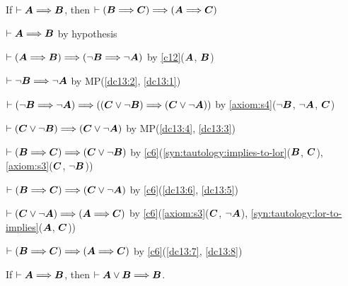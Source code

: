 \begin{dc}\label{c13}%
If $\vdash\boldsymbol{A}\Longrightarrow\boldsymbol{B}$,
then $\vdash(\boldsymbol{B}\Longrightarrow\boldsymbol{C})\Longrightarrow(\boldsymbol{A}\Longrightarrow\boldsymbol{C})$
\end{dc}

\begin{pf}
\item\label{dc13:1} $\vdash\boldsymbol{A}\Longrightarrow\boldsymbol{B}$ by hypothesis
\item\label{dc13:2} $\vdash(\boldsymbol{A}\Longrightarrow\boldsymbol{B})\Longrightarrow(\neg\boldsymbol{B}\Longrightarrow\neg\boldsymbol{A})$
  by \ref{c12}($\boldsymbol{A}$, $\boldsymbol{B}$)
\item\label{dc13:3} $\vdash\neg\boldsymbol{B}\Longrightarrow\neg\boldsymbol{A}$
  by MP(\ref{dc13:2}, \ref{dc13:1})
\item\label{dc13:4} $\vdash(\neg\boldsymbol{B}\Longrightarrow\neg\boldsymbol{A})\Longrightarrow((\boldsymbol{C}\lor\neg\boldsymbol{B})\Longrightarrow(\boldsymbol{C}\lor\neg\boldsymbol{A}))$
  by \ref{axiom:s4}($\neg\boldsymbol{B}$, $\neg\boldsymbol{A}$, $\boldsymbol{C}$)
\item\label{dc13:5} $\vdash(\boldsymbol{C}\lor\neg\boldsymbol{B})\Longrightarrow(\boldsymbol{C}\lor\neg\boldsymbol{A})$
  by MP(\ref{dc13:4}, \ref{dc13:3})
\item\label{dc13:6} $\vdash(\boldsymbol{B}\Longrightarrow\boldsymbol{C})\Longrightarrow(\boldsymbol{C}\lor\neg\boldsymbol{B})$
  by \ref{c6}(\ref{syn:tautology:implies-to-lor}($\boldsymbol{B}$, $\boldsymbol{C}$),
  \ref{axiom:s3}($\boldsymbol{C}$, $\neg\boldsymbol{B}$))
\item\label{dc13:7} $\vdash(\boldsymbol{B}\Longrightarrow\boldsymbol{C})\Longrightarrow(\boldsymbol{C}\lor\neg\boldsymbol{A})$
  by \ref{c6}(\ref{dc13:6}, \ref{dc13:5})
\item\label{dc13:8} $\vdash(\boldsymbol{C}\lor\neg\boldsymbol{A})\Longrightarrow(\boldsymbol{A}\Longrightarrow\boldsymbol{C})$
  by \ref{c6}(\ref{axiom:s3}($\boldsymbol{C}$, $\neg\boldsymbol{A}$),
  \ref{syn:tautology:lor-to-implies}($\boldsymbol{A}$, $\boldsymbol{C}$))
\item $\vdash(\boldsymbol{B}\Longrightarrow\boldsymbol{C})\Longrightarrow(\boldsymbol{A}\Longrightarrow\boldsymbol{C})$
  by \ref{c6}(\ref{dc13:7}, \ref{dc13:8})
\end{pf}

\begin{theorem}\label{thm:3-2-1}%
If $\vdash\boldsymbol{A}\Longrightarrow\boldsymbol{B}$, then $\vdash\boldsymbol{A}\lor\boldsymbol{B}\Longrightarrow\boldsymbol{B}$.
\end{theorem}

